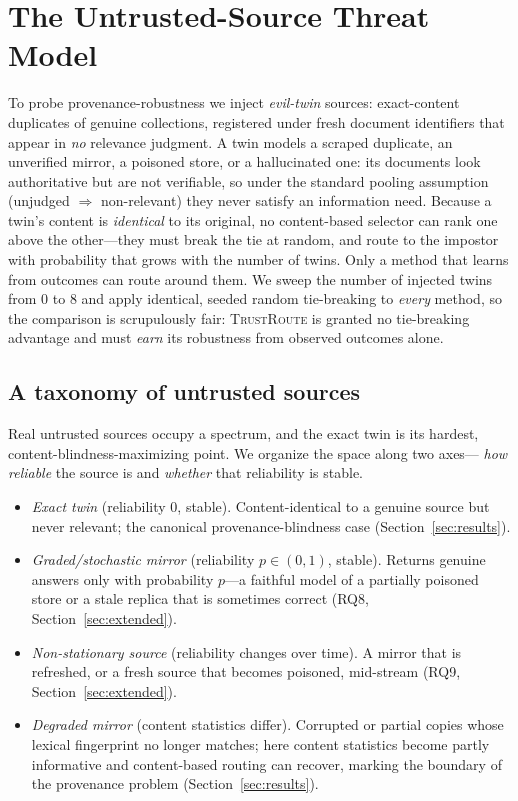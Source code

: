\documentclass[preprint,12pt]{elsarticle}
\newcommand{\system}{\textsc{TrustRoute}}
\begin{document}
\section{The Untrusted-Source Threat Model}\label{sec:threat}

To probe provenance-robustness we inject \emph{evil-twin} sources: exact-content
duplicates of genuine collections, registered under fresh document identifiers
that appear in \emph{no} relevance judgment. A twin models a scraped duplicate, an
unverified mirror, a poisoned store, or a hallucinated one: its documents look
authoritative but are not verifiable, so under the standard pooling assumption
(unjudged $\Rightarrow$ non-relevant) they never satisfy an information need.
Because a twin's content is \emph{identical} to its original, no content-based
selector can rank one above the other---they must break the tie at random, and
route to the impostor with probability that grows with the number of twins. Only
a method that learns from outcomes can route around them. We sweep the number of
injected twins from $0$ to $8$ and apply identical, seeded random tie-breaking to
\emph{every} method, so the comparison is scrupulously fair: \system{} is granted
no tie-breaking advantage and must \emph{earn} its robustness from observed
outcomes alone.

\subsection{A taxonomy of untrusted sources}
Real untrusted sources occupy a spectrum, and the exact twin is its hardest,
content-blindness-maximizing point. We organize the space along two axes---
\emph{how reliable} the source is and \emph{whether} that reliability is stable.

\begin{itemize}
\item \emph{Exact twin} (reliability $0$, stable). Content-identical to a genuine
source but never relevant; the canonical provenance-blindness case
(Section~\ref{sec:results}).
\item \emph{Graded/stochastic mirror} (reliability $p\in(0,1)$, stable). Returns
genuine answers only with probability $p$---a faithful model of a partially
poisoned store or a stale replica that is sometimes correct
(RQ8, Section~\ref{sec:extended}).
\item \emph{Non-stationary source} (reliability changes over time). A mirror that
is refreshed, or a fresh source that becomes poisoned, mid-stream
(RQ9, Section~\ref{sec:extended}).
\item \emph{Degraded mirror} (content statistics differ). Corrupted or partial
copies whose lexical fingerprint no longer matches; here content statistics
become partly informative and content-based routing can recover, marking the
boundary of the provenance problem (Section~\ref{sec:results}).
\end{itemize}
\end{document}

